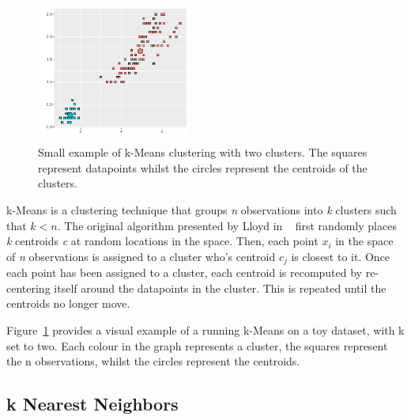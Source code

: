 \begin{figure}[t]
    \centering
    \includegraphics[width=0.45\textwidth]{background/graphics/smallest_clust_example.pdf}
    \caption{Small example of k-Means clustering with two clusters. The squares represent datapoints whilst the circles represent the centroids of the clusters.}
    \label{fig:kmeanex}
\end{figure}

k-Means is a clustering technique that groups \textit{n} observations into \textit{k} clusters such that $k < n$.
The original algorithm presented by Lloyd in ~\cite{kMeans} first randomly places \textit{k} centroids \textit{c} at random locations in the space.
Then, each point \textit{$x_{i}$} in the space of \textit{n} observations is assigned to a cluster who's centroid \textit{$c_{j}$} is closest to it.
Once each point has been assigned to a cluster, each centroid is recomputed by re-centering itself around the datapoints in the cluster.
This is repeated until the centroids no longer move.
 
Figure~\ref{fig:kmeanex} provides a visual example of a running k-Means on a toy dataset, with k set to two.
Each colour in the graph represents a cluster, the squares represent the n observations, whilst the circles represent the centroids.

\subsection{k Nearest Neighbors}~\label{sec:kNN}

